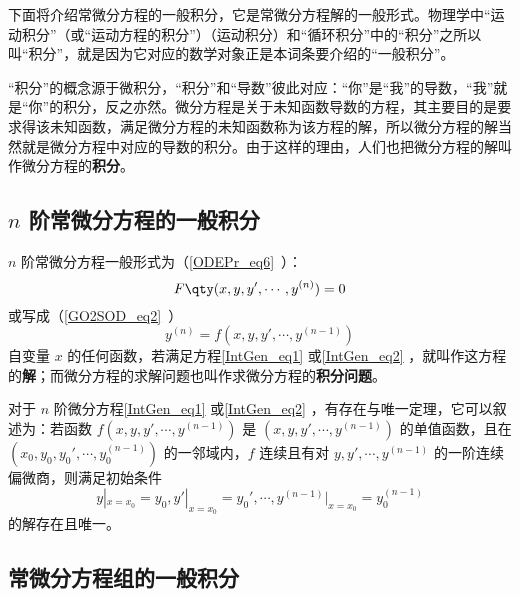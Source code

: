 下面将介绍常微分方程的一般积分，它是常微分方程解的一般形式。物理学中“运动积分”（或“运动方程的积分”）（运动积分）和“循环积分”中的“积分”之所以叫“积分”，就是因为它对应的数学对象正是本词条要介绍的“一般积分”。

“积分”的概念源于微积分，“积分”和“导数”彼此对应：“你”是“我”的导数，“我”就是“你”的积分，反之亦然。微分方程是关于未知函数导数的方程，其主要目的是要求得该未知函数，满足微分方程的未知函数称为该方程的解，所以微分方程的解当然就是微分方程中对应的导数的积分。由于这样的理由，人们也把微分方程的解叫作微分方程的\textbf{积分}。
\subsection{$n$ 阶常微分方程的一般积分}
$n$ 阶常微分方程一般形式为（\autoref{ODEPr_eq6}~）：
\begin{equation}\label{IntGen_eq1}
F \qty(x,y,y',\cdots,y^{(n)}) =0
\end{equation}
或写成（\autoref{GO2SOD_eq2}~）
\begin{equation}\label{IntGen_eq2}
y^{(n)}=f(x,y,y',\cdots,y^{(n-1)})
\end{equation}
自变量 $x$ 的任何函数，若满足方程\autoref{IntGen_eq1} 或\autoref{IntGen_eq2} ，就叫作这方程的\textbf{解}；而微分方程的求解问题也叫作求微分方程的\textbf{积分问题}。

对于 $n$ 阶微分方程\autoref{IntGen_eq1} 或\autoref{IntGen_eq2} ，有存在与唯一定理，它可以叙述为：若函数 $f(x,y,y',\cdots,y^{(n-1)})$ 是 $(x,y,y',\cdots,y^{(n-1)})$ 的单值函数，且在 $(x_0,y_0,y_0',\cdots,y_0^{(n-1)})$ 的一邻域内，$f$ 连续且有对 $y,y',\cdots,y^{(n-1)}$ 的一阶连续偏微商，则满足初始条件
\begin{equation}
y|_{x=x_0}=y_0,y'|_{x=x_0}=y_0',\cdots,y^{(n-1)}|_{x=x_0}=y_0^{(n-1)}
\end{equation}
的解存在且唯一。
\subsection{常微分方程组的一般积分}

